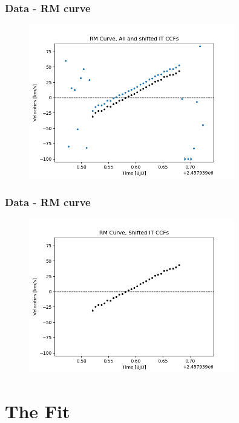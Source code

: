 \documentclass[show notes]{beamer}
\begin{document}
\begin{frame}
\frametitle{Data - RM curve}
\begin{figure}
	\centering
	\includegraphics[width=0.8\textwidth]{../figures/RM_all_shift.png}
	\label{fig:RM_all_shift}
\end{figure}
\end{frame}

\begin{frame}
\frametitle{Data - RM curve}
\begin{figure}
	\centering
	\includegraphics[width=0.8\textwidth]{../figures/RM_shift.png}
	\label{fig:RM_shift}
\end{figure}
\end{frame}

\section*{The Fit}
\end{document}
